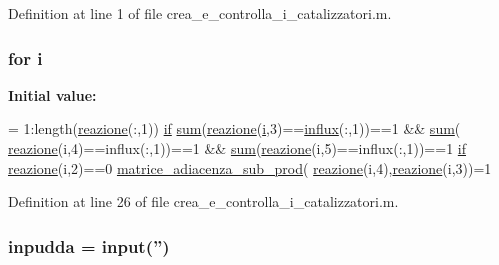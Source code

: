 Definition at line 1 of file crea\-\_\-e\-\_\-controlla\-\_\-i\-\_\-catalizzatori.\-m.

\hypertarget{a00104_a6f6ccfcf58b31cb6412107d9d5281426}{
\subsubsection[{i}]{\setlength{\rightskip}{0pt plus 5cm}for i}}\label{a00104_a6f6ccfcf58b31cb6412107d9d5281426}
{\bfseries Initial value\-:}
\begin{DoxyCode}
= 1:length(\hyperlink{a00102_a84d78e886b9f683403579e3911e7f046}{reazione}(:,1))
                \hyperlink{a00025_adf3394dfd4755fd0ef2854fe558ff8aa}{if} \hyperlink{a00028_a576bebae86b11914280920c448def53d}{sum}(\hyperlink{a00102_a84d78e886b9f683403579e3911e7f046}{reazione}(\hyperlink{a00027_a1de1a45bc56b002aa1ad94bb5f54a1ca}{i},3)==\hyperlink{a00028_a637d2af7e7b03600bcaf1931b999e3fc}{influx}(:,1))==1 && \hyperlink{a00028_a576bebae86b11914280920c448def53d}{sum}(
      \hyperlink{a00102_a84d78e886b9f683403579e3911e7f046}{reazione}(i,4)==influx(:,1))==1 && \hyperlink{a00028_a576bebae86b11914280920c448def53d}{sum}(\hyperlink{a00102_a84d78e886b9f683403579e3911e7f046}{reazione}(i,5)==influx(:,1))==1
                    \hyperlink{a00025_adf3394dfd4755fd0ef2854fe558ff8aa}{if} \hyperlink{a00102_a84d78e886b9f683403579e3911e7f046}{reazione}(i,2)==0                        
                        \hyperlink{a00104_a75ff61c394ad5be40e5084b8b794e2b2}{matrice\_adiacenza\_sub\_prod}(
      \hyperlink{a00102_a84d78e886b9f683403579e3911e7f046}{reazione}(i,4),\hyperlink{a00102_a84d78e886b9f683403579e3911e7f046}{reazione}(i,3))=1
\end{DoxyCode}


Definition at line 26 of file crea\-\_\-e\-\_\-controlla\-\_\-i\-\_\-catalizzatori.\-m.

\hypertarget{a00104_a89b9ef94bb4f5e3a4eec1cd4dc807e19}{
\subsubsection[{inpudda}]{\setlength{\rightskip}{0pt plus 5cm}inpudda = input('')}}\label{a00104_a89b9ef94bb4f5e3a4eec1cd4dc807e19}


